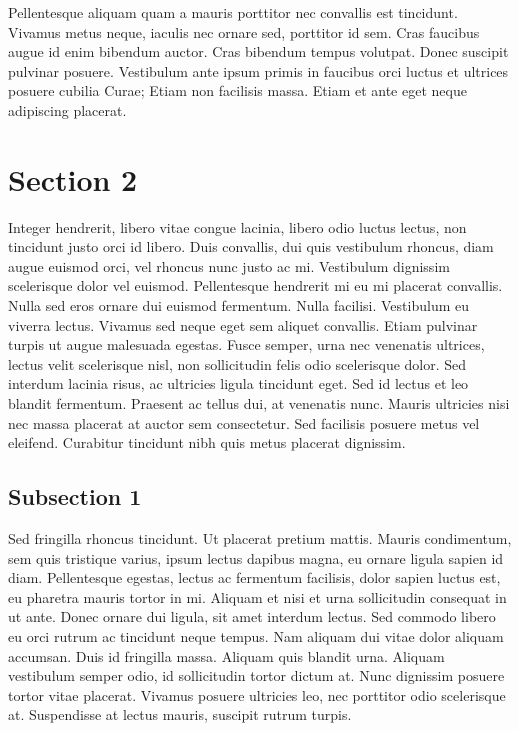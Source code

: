 Pellentesque aliquam quam a mauris porttitor nec convallis est tincidunt. Vivamus metus neque, iaculis nec ornare sed,
porttitor id sem. Cras faucibus augue id enim bibendum auctor. Cras bibendum tempus volutpat. Donec suscipit pulvinar
posuere. Vestibulum ante ipsum primis in faucibus orci luctus et ultrices posuere cubilia Curae; Etiam non facilisis
massa. Etiam et ante eget neque adipiscing placerat.


\section{Section 2}

Integer hendrerit, libero vitae congue lacinia, libero odio luctus lectus, non tincidunt justo orci id libero. Duis
convallis, dui quis vestibulum rhoncus, diam augue euismod orci, vel rhoncus nunc justo ac mi. Vestibulum dignissim
scelerisque dolor vel euismod. Pellentesque hendrerit mi eu mi placerat convallis. Nulla sed eros ornare dui euismod
fermentum. Nulla facilisi. Vestibulum eu viverra lectus. Vivamus sed neque eget sem aliquet convallis. Etiam pulvinar
turpis ut augue malesuada egestas. Fusce semper, urna nec venenatis ultrices, lectus velit scelerisque nisl, non
sollicitudin felis odio scelerisque dolor. Sed interdum lacinia risus, ac ultricies ligula tincidunt eget. Sed id lectus
et leo blandit fermentum. Praesent ac tellus dui, at venenatis nunc. Mauris ultricies nisi nec massa placerat at auctor
sem consectetur. Sed facilisis posuere metus vel eleifend. Curabitur tincidunt nibh quis metus placerat dignissim.


\subsection{Subsection 1}
Sed fringilla rhoncus tincidunt. Ut placerat pretium mattis. Mauris condimentum, sem quis tristique varius, ipsum lectus
dapibus magna, eu ornare ligula sapien id diam. Pellentesque egestas, lectus ac fermentum facilisis, dolor sapien luctus
est, eu pharetra mauris tortor in mi. Aliquam et nisi et urna sollicitudin consequat in ut ante. Donec ornare dui
ligula, sit amet interdum lectus. Sed commodo libero eu orci rutrum ac tincidunt neque tempus. Nam aliquam dui vitae
dolor aliquam accumsan. Duis id fringilla massa. Aliquam quis blandit urna. Aliquam vestibulum semper odio, id
sollicitudin tortor dictum at. Nunc dignissim posuere tortor vitae placerat. Vivamus posuere ultricies leo, nec
porttitor odio scelerisque at. Suspendisse at lectus mauris, suscipit rutrum turpis.


